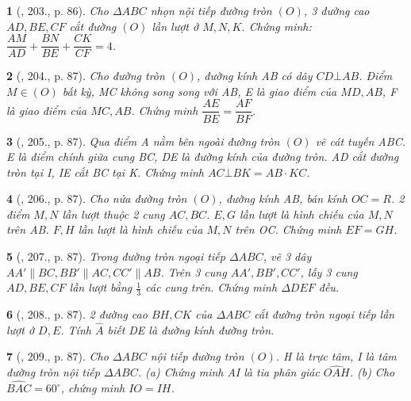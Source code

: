 \documentclass{article}
\newtheorem{baitoan}{}
\begin{document}
\begin{baitoan}[\cite{Binh_Toan_9_tap_2}, 203., p. 86]
	Cho $\Delta ABC$ nhọn nội tiếp đường tròn $(O)$, 3 đường cao $AD,BE,CF$ cắt đường $(O)$ lần lượt ở $M,N,K$. Chứng minh: $\dfrac{AM}{AD} + \dfrac{BN}{BE} + \dfrac{CK}{CF} = 4$.
\end{baitoan}

\begin{baitoan}[\cite{Binh_Toan_9_tap_2}, 204., p. 87]
	Cho đường tròn $(O)$, đường kính AB có dây $CD\bot AB$. Điểm $M\in(O)$ bất kỳ, MC không song song với AB, E là giao điểm của $MD,AB$, F là giao điểm của $MC,AB$. Chứng minh $\dfrac{AE}{BE} = \dfrac{AF}{BF}$.
\end{baitoan}

\begin{baitoan}[\cite{Binh_Toan_9_tap_2}, 205., p. 87]
	Qua điểm A nằm bên ngoài đường tròn $(O)$ vẽ cát tuyến ABC. E là điểm chính giữa cung BC, DE là đường kính của đường tròn. AD cắt đường tròn tại I, IE cắt BC tại K. Chứng minh $AC\bot BK = AB\cdot KC$.
\end{baitoan}

\begin{baitoan}[\cite{Binh_Toan_9_tap_2}, 206., p. 87]
	Cho nửa đường tròn $(O)$, đường kính AB, bán kính $OC = R$. 2 điểm $M,N$ lần lượt thuộc 2 cung $AC,BC$. $E,G$ lần lượt là hình chiếu của $M,N$ trên AB. $F,H$ lần lượt là hình chiếu của $M,N$ trên OC. Chứng minh $EF = GH$.
\end{baitoan}

\begin{baitoan}[\cite{Binh_Toan_9_tap_2}, 207., p. 87]
	Trong đường tròn ngoại tiếp $\Delta ABC$, vẽ 3 dây $AA'\parallel BC,BB'\parallel AC,CC'\parallel AB$. Trên 3 cung $AA',BB',CC'$, lấy 3 cung $AD,BE,CF$ lần lượt bằng $\frac{1}{3}$ các cung trên. Chứng minh $\Delta DEF$ đều.
\end{baitoan}

\begin{baitoan}[\cite{Binh_Toan_9_tap_2}, 208., p. 87]
	2 đường cao $BH,CK$ của $\Delta ABC$ cắt đường tròn ngoại tiếp lần lượt ở $D,E$. Tính $\widehat{A}$ biết DE là đường kính đường tròn.
\end{baitoan}

\begin{baitoan}[\cite{Binh_Toan_9_tap_2}, 209., p. 87]
	Cho $\Delta ABC$ nội tiếp đường tròn $(O)$. H là trực tâm, I là tâm đường tròn nội tiếp $\Delta ABC$. (a) Chứng minh AI là tia phân giác $\widehat{OAH}$. (b) Cho $\widehat{BAC} = 60^\circ$, chứng minh $IO = IH$.
\end{baitoan}
\end{document}
